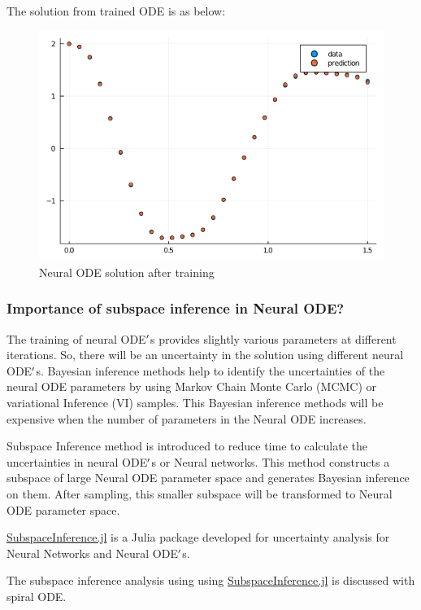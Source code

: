 \documentclass[12pt,a4paper]{article}
\begin{document}
The solution from trained ODE is as below: \begin{figure}
\centering
\includegraphics{img/final_node.png}
\caption{Neural ODE solution after training}
\end{figure}


\subsubsection{Importance of subspace inference in Neural ODE?}
The training of neural ODE\ensuremath{\rq}s provides slightly various parameters at different iterations. So, there will be an uncertainty in the solution using different neural ODE\ensuremath{\rq}s. Bayesian inference methods help to identify the uncertainties of the neural ODE parameters by using Markov Chain Monte Carlo (MCMC) or variational Inference (VI) samples. This Bayesian inference methods will be expensive when the number of parameters in the Neural ODE increases.

Subspace Inference method is introduced to reduce time to calculate the uncertainties in neural ODE\ensuremath{\rq}s or Neural networks. This method constructs a subspace of large Neural ODE parameter space and generates Bayesian inference on them. After sampling, this smaller subspace will be transformed to Neural ODE parameter space. 

\href{https://github.com/efmanu/SubspaceInference.jl}{SubspaceInference.jl} is a Julia package developed for uncertainty analysis for Neural Networks and Neural ODE\ensuremath{\rq}s.

The subspace inference analysis using using \href{https://github.com/efmanu/SubspaceInference.jl}{SubspaceInference.jl} is discussed with spiral ODE. 
\end{document}
